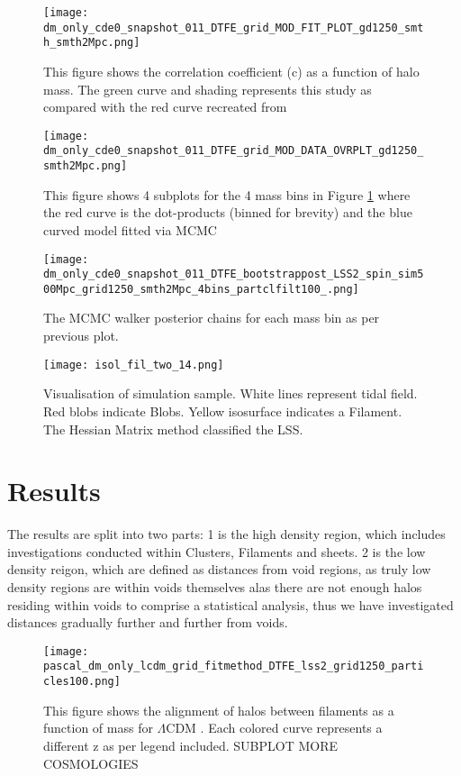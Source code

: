 \documentclass[a4paper,fleqn,usenatbib]{mnras}
\def \lcdm{$\Lambda$CDM }
\begin{document}
\begin{figure}
\centering
\texttt{[image: dm\_only\_cde0\_snapshot\_011\_DTFE\_grid\_MOD\_FIT\_PLOT\_gd1250\_smth\_smth2Mpc.png]} 
\caption{This figure shows the correlation coefficient (c) as a function of halo mass. The green curve and shading represents this study as compared with the red curve recreated from \citet{Trowland_13} }\label{mod_align}
\end{figure}
\begin{figure}
\centering
\texttt{[image: dm\_only\_cde0\_snapshot\_011\_DTFE\_grid\_MOD\_DATA\_OVRPLT\_gd1250\_smth2Mpc.png]} 
\caption{This figure shows 4 subplots for the 4 mass bins in Figure \ref{mod_align} where the red curve is the dot-products (binned for brevity) and the blue curved model fitted via MCMC}\label{mod_fit}
\end{figure}
\begin{figure}
\centering
\texttt{[image: dm\_only\_cde0\_snapshot\_011\_DTFE\_bootstrappost\_LSS2\_spin\_sim500Mpc\_grid1250\_smth2Mpc\_4bins\_partclfilt100\_.png]} 
\caption{The MCMC walker posterior chains for each mass bin as per previous plot.}\label{post_mc}
\end{figure}

\begin{figure*}
\centering
\texttt{[image: isol\_fil\_two\_14.png]} 
\caption{Visualisation of simulation sample. White lines represent tidal field. Red blobs indicate Blobs. Yellow isosurface indicates a Filament. The Hessian Matrix method classified the LSS.}\label{vis}
\end{figure*}

\section{Results}\label{results} 
\FloatBarrier
The results are split into two parts: 1 is the high density region, which includes investigations conducted within Clusters, Filaments and sheets. 2 is the low density reigon, which are defined as distances from void regions, as truly low density regions are within voids themselves alas there are not enough halos residing within voids to comprise a statistical analysis, thus we have investigated distances gradually further and further from voids.
\begin{figure}
\centering
\texttt{[image: pascal\_dm\_only\_lcdm\_grid\_fitmethod\_DTFE\_lss2\_grid1250\_particles100.png]} 
\caption{This figure shows the alignment of halos between filaments as a function of mass for \lcdm. Each colored curve represents a different z as per legend included. SUBPLOT MORE COSMOLOGIES }\label{lcdm_subdiv}
\end{figure}
\end{document}
